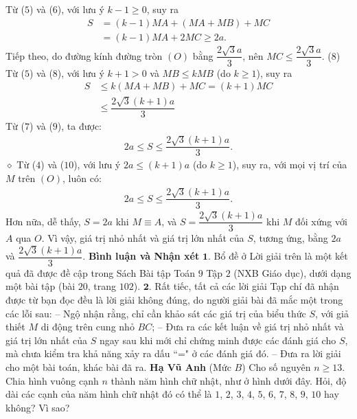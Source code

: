 \begin{multicols}{2}
	\vskip 0.05cm
	Từ ($5$) và ($6$), với lưu ý $k - 1 \ge 0$, suy ra
	\begin{align*}
		S &= (k - 1)MA + (MA + MB) + MC \\
		&= (k - 1)MA + 2MC \ge 2a.                      \tag{$7$}
	\end{align*}
	Tiếp theo, do đường kính đường tròn $(O)$ bằng $\dfrac{2\sqrt{3}a}{3}$, nên  $MC \le \dfrac{2\sqrt{3}a}{3}$. \hfill ($8$)
	\vskip 0.05cm
	Từ ($5$) và ($8$), với lưu ý $k + 1 > 0$ và $MB \le kMB$ (do $k \ge 1$), suy ra
	\begin{align*}
		S &\le k\left( {MA + MB} \right) + MC = \left( {k + 1} \right)MC \\
		&\le \dfrac{{2\sqrt 3 \left( {k + 1} \right)a}}{3} \tag{$9$}
	\end{align*}
	Từ ($7$) và ($9$), ta được:
	\begin{align*}
		2a \le S \le \dfrac{{2\sqrt 3 \left( {k + 1} \right)a}}{3}. \tag{$10$}
	\end{align*}
	$\diamond$ Từ ($4$) và ($10$), với lưu ý $2a \le (k + 1)a$ (do $k \ge 1$), suy ra, với mọi vị trí của $M$ trên $(O)$, luôn có:
	\begin{align*}
		2a \le S \le \dfrac{{2\sqrt 3 \left( {k + 1} \right)a}}{3}. 
	\end{align*}
	Hơn nữa, dễ thấy, $S = 2a$ khi $M \equiv A$, và $S = \dfrac{{2\sqrt 3 \left( {k + 1} \right)a}}{3}$  khi $M$ đối xứng với $A$ qua $O$.
	\vskip 0.05cm
	Vì vậy, giá trị nhỏ nhất và giá trị lớn nhất của $S$, tương ứng, bằng $2a$ và $\dfrac{{2\sqrt 3 \left( {k + 1} \right)a}}{3}$.
	\vskip 0.05cm
	\textbf{\color{thachthuctoanhoc}Bình luận và Nhận xét}
	\vskip 0.05cm
	$\pmb{1.}$ Bổ đề ở Lời giải trên là một kết quả đã được đề cập trong Sách Bài tập Toán $9$ Tập $2$ (NXB Giáo dục), dưới dạng một bài tập (bài $20$, trang $102$).
	\vskip 0.05cm
	$\pmb{2.}$ Rất tiếc, tất cả các lời giải Tạp chí đã nhận được từ bạn đọc đều là lời giải không đúng, do người giải bài đã mắc một trong các lỗi sau:
	\vskip 0.05cm
	-- Ngộ nhận rằng, chỉ cần khảo sát các giá trị của biểu thức $S$, với giả thiết $M$ di động trên cung nhỏ $BC$;
	\vskip 0.05cm
	-- Đưa ra các kết luận về giá trị nhỏ nhất và giá trị lớn nhất của $S$ ngay sau khi mới chỉ chứng minh được các đánh giá cho $S$, mà chưa kiểm tra khả năng xảy ra dấu ``=" ở các đánh giá đó.
	\vskip 0.05cm
	-- Đưa ra lời giải cho một bài toán, khác bài đã ra.
	\vskip 0.05cm
	\hfill \textbf{\color{thachthuctoanhoc}Hạ Vũ Anh}
	\vskip 0.05cm
	{}
	(Mức $B$) Cho số nguyên $n\ge 13$. Chia hình vuông cạnh $n$ thành năm hình chữ nhật, như ở hình dưới đây. Hỏi, độ dài các cạnh của năm hình chữ nhật đó có thể là $1$, $2$, $3$, $4$, $5$, $6$, $7$, $8$, $9$, $10$ hay không? Vì sao?

\end{multicols}
